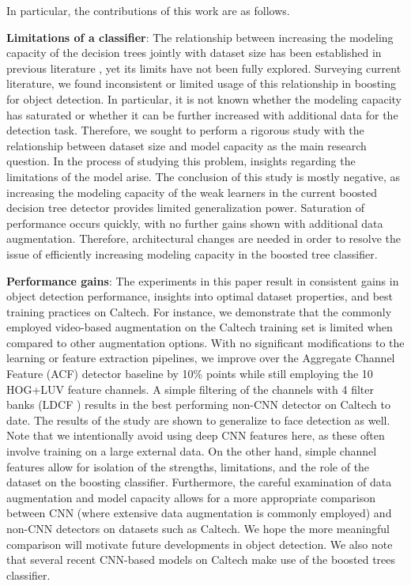\documentclass[a4paper,conference]{IEEEtran_icpr}
\begin{document}
 In particular, the contributions of this work are as follows.


\textbf{Limitations of a classifier}: The relationship between increasing the modeling capacity of the decision trees jointly with dataset size has been established in previous literature \cite{boost,ldcf,Das_ITSC14}, yet its limits have not been fully explored. Surveying current literature, we found inconsistent or limited usage of this relationship in boosting for object detection. In particular, it is not known whether the modeling capacity has saturated or whether it can be further increased with additional data for the detection task. Therefore, we sought to perform a rigorous study with the relationship between dataset size and model capacity as the main research question. In the process of studying this problem, insights regarding the limitations of the model arise. The conclusion of this study is mostly negative, as increasing the modeling capacity of the weak learners in the current boosted decision tree detector provides limited generalization power. Saturation of performance occurs quickly, with no further gains shown with additional data augmentation. Therefore, architectural changes are needed in order to resolve the issue of efficiently increasing modeling capacity in the boosted tree classifier. 







\textbf{Performance gains}: The experiments in this paper result in consistent gains in object detection performance, insights into optimal dataset properties, and best training practices on Caltech. For instance, we demonstrate that the commonly employed video-based augmentation \cite{ldcf,checkerboard} on the Caltech training set is limited when compared to other augmentation options. With no significant modifications to the learning or feature extraction pipelines, we improve over the Aggregate Channel Feature (ACF) detector \cite{DollarPAMI14pyramids} baseline by 10\% points while still employing the 10 HOG+LUV feature channels. A simple filtering of the channels with 4 filter banks (LDCF \cite{ldcf}) results in the best performing non-CNN detector on Caltech to date. The results of the study are shown to generalize to face detection as well. Note that we intentionally avoid using deep CNN features here, as these often involve training on a large external data. On the other hand, simple channel features \cite{DollarPAMI14pyramids} allow for isolation of the strengths, limitations, and the role of the dataset on the boosting classifier. Furthermore, the careful examination of data augmentation and model capacity allows for a more appropriate comparison between CNN (where extensive data augmentation is commonly employed) and non-CNN detectors on datasets such as Caltech. We hope the more meaningful comparison will motivate future developments in object detection. We also note that several recent CNN-based models on Caltech \cite{hosang2015taking,rotfilt,deepparts} make use of the boosted trees classifier.   
\end{document}
